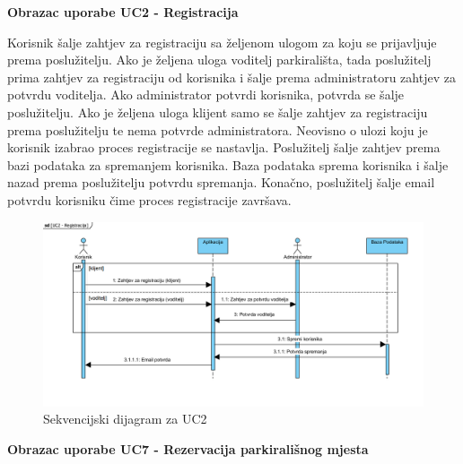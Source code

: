 				\vspace{4cm}
				
				\textbf {Obrazac uporabe UC2 - Registracija}
				
				\vspace{1cm}
				
				Korisnik šalje zahtjev za registraciju sa željenom ulogom za koju se prijavljuje prema poslužitelju. Ako je željena uloga voditelj parkirališta, tada poslužitelj prima zahtjev za registraciju od korisnika i šalje prema administratoru zahtjev za potvrdu voditelja. Ako administrator potvrdi korisnika, potvrda se šalje poslužitelju. Ako je željena uloga klijent samo se šalje zahtjev za registraciju prema poslužitelju te nema potvrde administratora.
				Neovisno o ulozi koju je korisnik izabrao proces registracije se nastavlja. Poslužitelj šalje zahtjev prema bazi podataka za spremanjem korisnika. Baza podataka sprema korisnika i šalje nazad prema poslužitelju potvrdu spremanja. Konačno, poslužitelj šalje email potvrdu korisniku čime proces registracije završava.
				
				\vspace{1cm}
				
				
				\begin{figure}[H]
					\centering
					\includegraphics[width=\textwidth]{slike/SD_UC2.JPG} 
					\caption{Sekvencijski dijagram za UC2}
					\label{fig:promjene9} 
				\end{figure}
				
				\vspace{4cm}
				
				\textbf {Obrazac uporabe UC7 - Rezervacija parkirališnog mjesta}
				
				\vspace{1cm}
				
